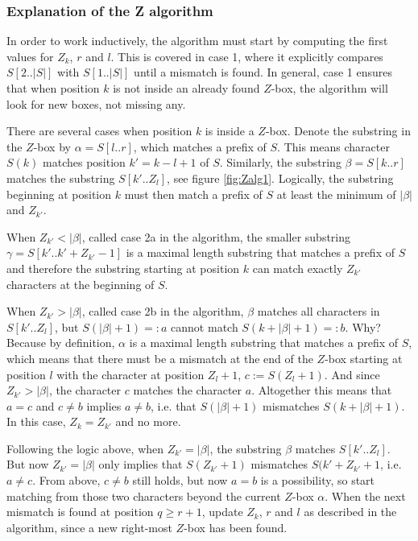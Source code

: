 \subsubsection{Explanation of the Z algorithm}
In order to work inductively, the algorithm must start by computing the first values for $Z_k$, $r$ and $l$. This is covered in case 1, where it explicitly compares $S[2..|S|]$ with $S[1..|S|]$ until a mismatch is found. In general, case 1 ensures that when position $k$ is not inside an already found $Z$-box, the algorithm will look for new boxes, not missing any. 

There are several cases when position $k$ is inside a $Z$-box. Denote the substring in the $Z$-box by $\alpha=S[l..r]$, which matches a prefix of $S$. This means character $S(k)$ matches position $k'=k-l+1$ of $S$. Similarly, the substring $\beta=S[k..r]$ matches the substring $S[k'..Z_l]$, see figure \ref{fig:Zalg1}. Logically, the substring beginning at position $k$ must then match a prefix of $S$ at least the minimum of $|\beta|$ and $Z_{k'}$. 

When $Z_{k'}<|\beta|$, called case 2a in the algorithm, the smaller substring $\gamma=S[k'..k'+Z_{k'}-1]$ is a maximal length substring that matches a prefix of $S$ and therefore the substring starting at position $k$ can match exactly $Z_{k'}$ characters at the beginning of $S$. 

When $Z_{k'}>|\beta|$, called case 2b in the algorithm, $\beta$ matches all characters in $S[k'..Z_l]$, but $S(|\beta|+1)=:a$ cannot match $S(k+|\beta|+1)=:b$. Why? Because by definition, $\alpha$ is a maximal length substring that matches a prefix of $S$, which means that there must be a mismatch at the end of the $Z$-box starting at position $l$ with the character at position $Z_l+1$, $c:=S(Z_l+1)$. And since $Z_{k'}>|\beta|$, the character $c$ matches the character $a$. Altogether this means that $a=c$ and $c\neq b$ implies $a\neq b$, i.e. that $S(|\beta|+1)$ mismatches $S(k+|\beta|+1)$. In this case, $Z_k=Z_{k'}$ and no more. 

Following the logic above, when $Z_{k'}=|\beta|$, the substring $\beta$ matches $S[k'..Z_l]$. But now $Z_{k'}=|\beta|$ only implies that $S(Z_{k'}+1)$ mismatches $S(k'+Z_{k'}+1$, i.e. $a\neq c$. From above, $c\neq b$ still holds, but now $a=b$ is a possibility, so start matching from those two characters beyond the current $Z$-box $\alpha$. When the next mismatch is found at position $q\geq r+1$, update $Z_k$, $r$ and $l$ as described in the algorithm, since a new right-most $Z$-box has been found. 

